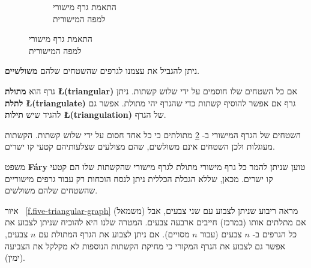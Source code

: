 \begin{figure}[tb]
\begin{center}
\begin{subfigure}{.4\textwidth}
\caption{התאמת גרף מישורי\\
למפה המישורית}
\label{f.five-planar-graph-graph}
\end{subfigure}
\end{center}
\end{figure}

ניתן להגביל את עצמנו לגרפים שהשטחים שלהם
\textbf{משולשיים}.

\begin{definition}
גרף הוא
\textbf{מתולת
\L{(triangular)}}
אם כל השטחים שלו חוסמים על ידי שלוש קשתות. ניתן 
\textbf{לתלת
\L{(triangulate)}}
גרף אם אפשר להוסיף קשתות כדי שהגרף יהי מתולת. אפשר גם להגיד שיש
\textbf{תילות
\L{(triangulation)}}
של הגרף.
\end{definition}
\begin{example}
השטחים של הגרף המישורי ב-%
\ref{f.five-planar-graph-graph}
מתולתים כי כל אחד חסום על ידי שלוש קשתות. הקשתות מעוגלות ולכן השטחים אינם משולשים, שהם מצולעים שצלעותיהם קטעי קו ישרים.
\end{example}
\begin{advanced}
משפט
\textbf{F\'{a}ry}
טוען שניתן להמר כל גרף מישורי מתולת לגרף מישורי שהקשתות שלו הם קטעי קו ישרים. מכאן, שללא הגבלת הכללית ניתן לנסח הוכחות רק עבור גרפים מישוריים שהשטחים שלהם משולשים.
\end{advanced}
\begin{example}
איור%
~\ref{f.five-triangular-graph}
(משמאל) מראה ריבוע שניתן לצבוע עם שני צבעים, אבל אם מתלתים אותו (במרכז) חייבים ארבעה צבעים. המטרה שלנו היא להוכיח שניתן לצבוע את כל הגרפים ב-%
$n$
צבעים (עבור
$n$
מסויים). אם ניתן לצבוע את הגרף המתולת עם 
$n$
צבעים, אפשר גם לצבוע את הגרף המקורי כי מחיקת הקשתות הנוספות לא מקלקל את הצביעה (ימין).
\end{example}

